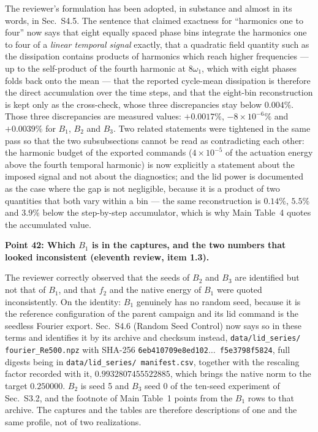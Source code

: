 \documentclass[11pt,a4paper]{article}
\begin{document}
The reviewer's formulation has been adopted, in substance and almost in its words, in
Sec.~S4.5. The sentence that claimed exactness for ``harmonics one to four'' now says
that eight equally spaced phase bins integrate the harmonics one to four of a
\emph{linear temporal signal} exactly, that a quadratic field quantity such as the
dissipation contains products of harmonics which reach higher frequencies --- up to the
self-product of the fourth harmonic at \(8\omega_1\), which with eight phases folds back
onto the mean --- that the reported cycle-mean dissipation is therefore the direct
accumulation over the time steps, and that the eight-bin reconstruction is kept only as
the cross-check, whose three discrepancies stay below \(0.004\%\). Those three
discrepancies are measured values: \(+0.0017\%\), \(-8\times10^{-6}\%\) and
\(+0.0039\%\) for \(B_1\), \(B_2\) and \(B_3\). Two related statements were tightened in
the same pass so that the two subsubsections cannot be read as contradicting each other:
the harmonic budget of the exported commands (\(4\times10^{-5}\) of the actuation energy
above the fourth temporal harmonic) is now explicitly a statement about the imposed
signal and not about the diagnostics; and the lid power is documented as the case where
the gap is not negligible, because it is a product of two quantities that both vary
within a bin --- the same reconstruction is \(0.14\%\), \(5.5\%\) and \(3.9\%\) below the
step-by-step accumulator, which is why Main Table~4 quotes the accumulated value.

\vspace{1em}

\noindent\textbf{Point 42: Which \(B_1\) is in the captures, and the two numbers that
looked inconsistent (eleventh review, item 1.3).}

The reviewer correctly observed that the seeds of \(B_2\) and \(B_3\) are identified but
not that of \(B_1\), and that \(f_2\) and the native energy of \(B_1\) were quoted
inconsistently. On the identity: \(B_1\) genuinely has no random seed, because it is the
reference configuration of the parent campaign and its lid command is the seedless
Fourier export. Sec.~S4.6 (Random Seed Control) now says so in these terms and
identifies it by its archive and checksum instead, \texttt{data/lid\_series/}\hspace{0pt}%
\texttt{fourier\_Re500.npz} with SHA-256 \texttt{6eb410709e8ed102}$\ldots$\texttt{%
f5e3798f5824}, full digests being in \texttt{data/lid\_series/}\hspace{0pt}\texttt{%
manifest.csv}, together with the rescaling factor recorded with it,
\(0.9932807455522885\), which brings the native norm to the target \(0.250000\). \(B_2\)
is seed 5 and \(B_3\) seed 0 of the ten-seed experiment of Sec.~S3.2, and the footnote of
Main Table~1 points from the \(B_1\) rows to that archive. The captures and the tables
are therefore descriptions of one and the same profile, not of two realizations.
\end{document}
